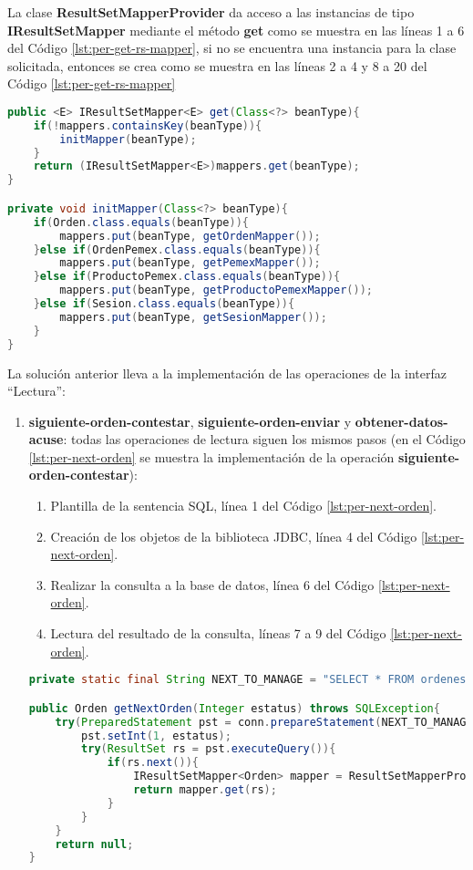 La clase \textbf{ResultSetMapperProvider} da acceso a las instancias de tipo \textbf{IResultSetMapper} mediante el método \textbf{get} como se muestra en las líneas 1 a 6 del Código \ref{lst:per-get-rs-mapper}, si no se encuentra una instancia para la clase solicitada, entonces se crea como se muestra en las líneas 2 a 4 y 8 a 20 del Código \ref{lst:per-get-rs-mapper}
\begin{lstlisting}[language=Java, caption={Obtención de instancias de IResultSetMapper.}, captionpos=b, label={lst:per-get-rs-mapper}]
public <E> IResultSetMapper<E> get(Class<?> beanType){
	if(!mappers.containsKey(beanType)){
		initMapper(beanType);
	}
	return (IResultSetMapper<E>)mappers.get(beanType);
}

private void initMapper(Class<?> beanType){
	if(Orden.class.equals(beanType)){
		mappers.put(beanType, getOrdenMapper());
	}else if(OrdenPemex.class.equals(beanType)){
		mappers.put(beanType, getPemexMapper());
	}else if(ProductoPemex.class.equals(beanType)){
		mappers.put(beanType, getProductoPemexMapper());
	}else if(Sesion.class.equals(beanType)){
		mappers.put(beanType, getSesionMapper());
	}
}
\end{lstlisting}

La solución anterior lleva a la implementación de las operaciones de la interfaz ``Lectura'':
\begin{enumerate}
	\item \textbf{siguiente-orden-contestar}, \textbf{siguiente-orden-enviar} y \textbf{obtener-datos-acuse}: todas las operaciones de lectura siguen los mismos pasos (en el Código \ref{lst:per-next-orden} se muestra la implementación de la operación \textbf{siguiente-orden-contestar}):
	\begin{enumerate}
		\item Plantilla de la sentencia SQL, línea 1 del Código \ref{lst:per-next-orden}.
		\item Creación de los objetos de la biblioteca JDBC, línea 4 del Código \ref{lst:per-next-orden}.
		\item Realizar la consulta a la base de datos, línea 6 del Código \ref{lst:per-next-orden}.
		\item Lectura del resultado de la consulta, líneas 7 a 9 del Código \ref{lst:per-next-orden}.
	\end{enumerate}

	\begin{lstlisting}[language=Java, caption={Lectura de una orden de reposición desde la base de datos.}, captionpos=b, label={lst:per-next-orden}]
private static final String NEXT_TO_MANAGE = "SELECT * FROM ordenes WHERE estatus = ? ORDER BY fecha_insersion LIMIT 1";

public Orden getNextOrden(Integer estatus) throws SQLException{
	try(PreparedStatement pst = conn.prepareStatement(NEXT_TO_MANAGE)){
		pst.setInt(1, estatus);
		try(ResultSet rs = pst.executeQuery()){
    		if(rs.next()){
    			IResultSetMapper<Orden> mapper = ResultSetMapperProvider.getInstance().get(Orden.class);
    			return mapper.get(rs);
    		}
		}
	}
	return null;
}
	\end{lstlisting}
\end{enumerate}

